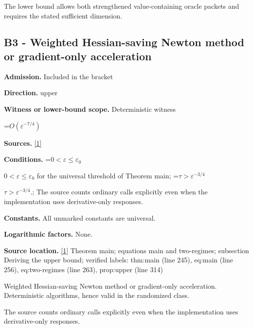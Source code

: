 \documentclass[10pt,a4paper]{article}
\newcommand{\AtlasMath}[1]{\par\begingroup\centering\setbox0=\hbox{$\displaystyle #1$}\ifdim\wd0>1.4\linewidth\typeout{ATLAS WIDE FORMULA: \the\wd0}\fi\ifdim\wd0>\linewidth\resizebox{\linewidth}{!}{\box0}\else\box0\fi\par\endgroup}
\newcommand{\AtlasInlineMath}[1]{\begingroup\setbox0=\hbox{$#1$}\ifdim\wd0>.4\linewidth\endgroup\AtlasMath{#1}\else\endgroup$#1$\fi}
\begin{document}
The lower bound allows both strengthened value-containing oracle packets and requires the stated sufficient dimension.



\subsection{B3 - Weighted Hessian-saving Newton method or gradient-only acceleration}


\textbf{Admission.} Included in the bracket



\textbf{Direction.} upper



\textbf{Witness or lower-bound scope.} Deterministic witness



\AtlasMath{O(\varepsilon^{-7/4})}


\textbf{Sources.} \href{https://github.com/WU-Wendao/Colombo/blob/main/colombo_sensorium/Complexity_altas/data/sources/colombo/A4/manuscript.pdf}{[1]}



\textbf{Conditions.} \AtlasInlineMath{0<\varepsilon\le\varepsilon_0} for the universal threshold of Theorem main; \AtlasInlineMath{\tau>\varepsilon^{-3/4}}.; The source counts ordinary calls explicitly even when the implementation uses derivative-only responses.



\textbf{Constants.} All unmarked constants are universal.



\textbf{Logarithmic factors.} None.



\textbf{Source location.} \href{https://github.com/WU-Wendao/Colombo/blob/main/colombo_sensorium/Complexity_altas/data/sources/colombo/A4/manuscript.pdf}{[1]} Theorem main; equations main and two-regimes; subsection Deriving the upper bound; verified labels: thm:main (line 245), eq:main (line 256), eq:two-regimes (line 263), prop:upper (line 314)



Weighted Hessian-saving Newton method or gradient-only acceleration. Deterministic algorithms, hence valid in the randomized class.



The source counts ordinary calls explicitly even when the implementation uses derivative-only responses.
\end{document}
